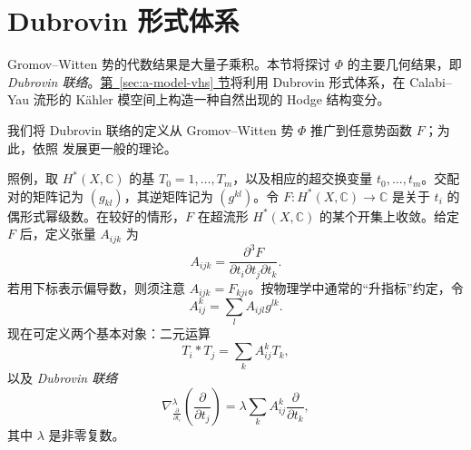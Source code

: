 \section{Dubrovin 形式体系}\label{sec:dubrovin-formalism}
Gromov--Witten 势的代数结果是大量子乘积。本节将探讨 $\Phi$ 的主要几何结果，即 \emph{Dubrovin 联络}。\hyperref[sec:a-model-vhs]{第~\ref*{sec:a-model-vhs} 节}将利用 Dubrovin 形式体系，在 Calabi--Yau 流形的 Kähler 模空间上构造一种自然出现的 Hodge 结构变分。

我们将 Dubrovin 联络的定义从 Gromov--Witten 势 $\Phi$ 推广到任意势函数 $F$；为此，依照  发展更一般的理论。

照例，取 $H^*(X,\mathbb C)$ 的基 $T_0=1,\ldots,T_m$，以及相应的超交换变量 $t_0,\ldots,t_m$。交配对的矩阵记为 $(g_{kl})$，其逆矩阵记为 $(g^{kl})$。令 $F\colon H^*(X,\mathbb C)\to\mathbb C$ 是关于 $t_i$ 的偶形式幂级数。在较好的情形，$F$ 在超流形 $H^*(X,\mathbb C)$ 的某个开集上收敛。给定 $F$ 后，定义张量 $A_{ijk}$ 为
\begin{equation}\label{eq:dubrovin-cubic-tensor}
A_{ijk}=\frac{\partial^3F}{\partial t_i\partial t_j\partial t_k}.
\end{equation}
若用下标表示偏导数，则须注意 $A_{ijk}=F_{kji}$。按物理学中通常的“升指标”约定，令
\begin{equation}\label{eq:dubrovin-raised-tensor}
A_{ij}^k=\sum_lA_{ijl}g^{lk}.
\end{equation}
现在可定义两个基本对象：二元运算
\[
T_i*T_j=\sum_kA_{ij}^kT_k,
\]
以及 \emph{Dubrovin 联络}
\[
\nabla^\lambda_{\frac{\partial}{\partial t_i}}
\left(\frac{\partial}{\partial t_j}\right)
=\lambda\sum_kA_{ij}^k\frac{\partial}{\partial t_k},
\]
其中 $\lambda$ 是非零复数。

